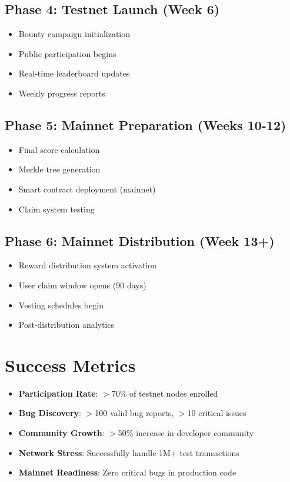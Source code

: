 \documentclass[11pt,a4paper]{article}
\begin{document}
\subsection{Phase 4: Testnet Launch (Week 6)}
\begin{itemize}
    \item Bounty campaign initialization
    \item Public participation begins
    \item Real-time leaderboard updates
    \item Weekly progress reports
\end{itemize}

\subsection{Phase 5: Mainnet Preparation (Weeks 10-12)}
\begin{itemize}
    \item Final score calculation
    \item Merkle tree generation
    \item Smart contract deployment (mainnet)
    \item Claim system testing
\end{itemize}

\subsection{Phase 6: Mainnet Distribution (Week 13+)}
\begin{itemize}
    \item Reward distribution system activation
    \item User claim window opens (90 days)
    \item Vesting schedules begin
    \item Post-distribution analytics
\end{itemize}

\section{Success Metrics}

\begin{itemize}
    \item \textbf{Participation Rate}: $>$70\% of testnet nodes enrolled
    \item \textbf{Bug Discovery}: $>$100 valid bug reports, $>$10 critical issues
    \item \textbf{Community Growth}: $>$50\% increase in developer community
    \item \textbf{Network Stress}: Successfully handle 1M+ test transactions
    \item \textbf{Mainnet Readiness}: Zero critical bugs in production code
\end{itemize}
\end{document}
